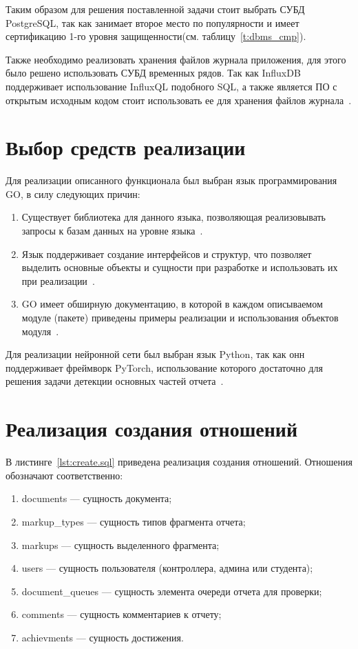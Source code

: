 Таким образом для решения поставленной задачи стоит выбрать СУБД PostgreSQL, так как занимает второе место по популярности  и имеет сертификацию 1-го уровня защищенности(см. таблицу~\ref{t:dbms_cmp}).

Также необходимо реализовать хранения файлов журнала приложения, для этого было решено использовать СУБД временных рядов. Так как InfluxDB поддерживает использование InfluxQL подобного SQL, а также является ПО с открытым исходным кодом стоит использовать ее для хранения файлов журнала~\cite{time_db}.

\section{Выбор средств реализации}
Для реализации описанного функционала был выбран язык программирования GO, в силу следующих причин:
\begin{enumerate}
	\item Существует библиотека для данного языка, позволяющая реализовывать запросы к базам данных на уровне языка~\cite{gorm}.
	\item Язык поддерживает создание интерфейсов и структур, что позволяет выделить основные объекты и сущности при разработке и использовать их при реализации~\cite{go_interface}.
	\item GO имеет обширную документацию, в которой в каждом описываемом модуле (пакете) приведены примеры реализации и использования объектов модуля~\cite{go_package}.
\end{enumerate}

Для реализации нейронной сети был выбран язык Python, так как онн поддерживает фреймворк PyTorch, использование которого достаточно для решения задачи детекции основных частей отчета~\cite{pytorch}.


\section{Реализация создания отношений}
В листинге~\ref{lst:create.sql} приведена реализация создания отношений.
Отношения обозначают соответственно:
\begin{enumerate}
	\item documents --- сущность документа;
	\item markup\_types --- сущность типов фрагмента отчета;
	\item markups --- сущность выделенного фрагмента;
	\item users --- сущность пользователя (контроллера, админа или студента);
	\item document\_queues --- сущность элемента очереди отчета для проверки;
	\item comments --- сущность комментариев к отчету;
	\item achievments --- сущность достижения.
\end{enumerate}


